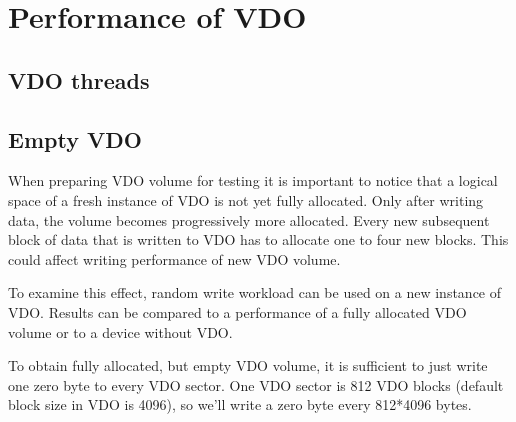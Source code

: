 \documentclass[
  color, %
  table, %
  lof,   %
  lot,   %
]{fithesis3}
\begin{document}
\chapter{Performance of VDO}
\label{testing}


\section{VDO threads}


\section{Empty VDO}
When preparing VDO volume for testing it is important to notice that a logical space of a fresh instance of VDO is not yet fully allocated. Only after writing data, the volume becomes progressively more allocated. Every new subsequent block of data that is written to VDO has to allocate one to four new blocks. This could affect writing performance of new VDO volume.

To examine this effect, random write workload can be used on a new instance of VDO. Results can be compared to a performance of a fully allocated VDO volume or to a device without VDO.

To obtain fully allocated, but empty VDO volume, it is sufficient to just write one zero byte to every VDO sector. One VDO sector is 812 VDO blocks (default block size in VDO is 4096), so we'll write a zero byte every 812*4096 bytes. 
\end{document}
